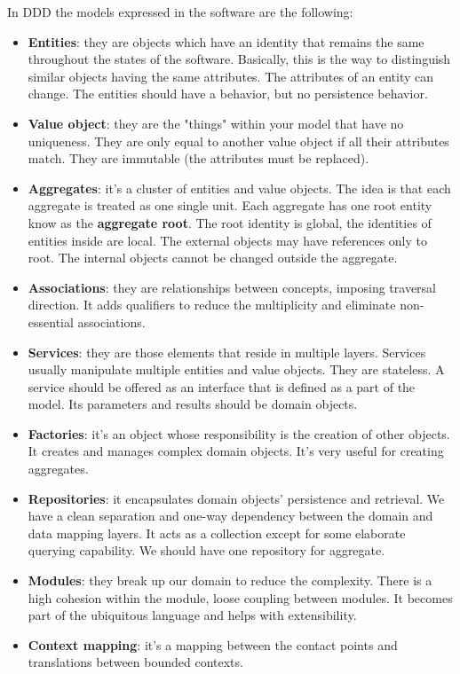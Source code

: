 In DDD the models expressed in the software are the following:
\begin{itemize}
    \item \textbf{Entities}: they are objects which have an identity that remains the same throughout the states of the software. Basically, this is the way to distinguish similar objects having the same attributes. The attributes of an entity can change. The entities should have a behavior, but no persistence behavior.
    \item \textbf{Value object}: they are the "things" within your model that have no uniqueness. They are only equal to another value object if all their attributes match. They are immutable (the attributes must be replaced).
    \item \textbf{Aggregates}: it's a cluster of entities and value objects. The idea is that each aggregate is treated as one single unit. Each aggregate has one root entity know as the \textbf{aggregate root}. The root identity is global, the identities of entities inside are local. The external objects may have references only to root. The internal objects cannot be changed outside the aggregate.
    \item \textbf{Associations}: they are relationships between concepts, imposing traversal direction. It adds qualifiers to reduce the multiplicity and eliminate non-essential associations.
    \item \textbf{Services}: they are those elements that reside in multiple layers. Services usually manipulate multiple entities and value objects. They are stateless. A service should be offered as an interface that is defined as a part of the model. Its parameters and results should be domain objects.
    \item \textbf{Factories}: it's an object whose responsibility is the creation of other objects. It creates and manages complex domain objects. It's very useful for creating aggregates.
    \item \textbf{Repositories}: it encapsulates domain objects' persistence and retrieval. We have a clean separation and one-way dependency between the domain and data mapping layers. It acts as a collection except for some elaborate querying capability. We should have one repository for aggregate.
    \item \textbf{Modules}: they break up our domain to reduce the complexity. There is a high cohesion within the module, loose coupling between modules. It becomes part of the ubiquitous language and helps with extensibility.
    \item \textbf{Context mapping}: it's a mapping between the contact points and translations between bounded contexts.
\end{itemize}